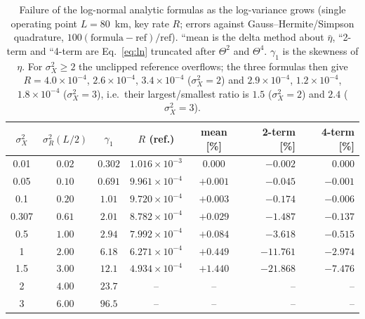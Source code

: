 \begin{table}[htbp]
\centering\small
\caption{Failure of the log-normal analytic formulas as the log-variance grows (single operating point $L=80$~km, key rate $R$; errors against Gauss--Hermite/Simpson quadrature, $100(\text{formula}-\text{ref})/\text{ref}$). ``mean is the delta method about $\bar\eta$, ``2-term and ``4-term are Eq.~\eqref{eq:ln} truncated after $\Theta^2$ and $\Theta^4$. $\gamma_1$ is the skewness of $\eta$. For $\sigma_X^2\ge2$ the unclipped reference overflows; the three formulas then give $R=4.0\times10^{-4}$, $2.6\times10^{-4}$, $3.4\times10^{-4}$ ($\sigma_X^2=2$) and $2.9\times10^{-4}$, $1.2\times10^{-4}$, $1.8\times10^{-4}$ ($\sigma_X^2=3$), i.e.\ their largest/smallest ratio is $1.5$ ($\sigma_X^2=2$) and $2.4$ ($\sigma_X^2=3$).}
\label{tab:stress}
\begin{tabular}{cccccrr}
\toprule
$\sigma_X^2$ & $\sigma_R^2(L/2)$ & $\gamma_1$ & $R$ (ref.) & mean [\%] & 2-term [\%] & 4-term [\%]\\
\midrule
0.01 & $0.02$ & $0.302$ & $1.016\times10^{-3}$ & $0.000$ & $-0.002$ & $0.000$ \\
0.05 & $0.10$ & $0.691$ & $9.961\times10^{-4}$ & $+0.001$ & $-0.045$ & $-0.001$ \\
0.1 & $0.20$ & $1.01$ & $9.720\times10^{-4}$ & $+0.003$ & $-0.174$ & $-0.006$ \\
0.307 & $0.61$ & $2.01$ & $8.782\times10^{-4}$ & $+0.029$ & $-1.487$ & $-0.137$ \\
0.5 & $1.00$ & $2.94$ & $7.992\times10^{-4}$ & $+0.084$ & $-3.618$ & $-0.515$ \\
1 & $2.00$ & $6.18$ & $6.271\times10^{-4}$ & $+0.449$ & $-11.761$ & $-2.974$ \\
1.5 & $3.00$ & $12.1$ & $4.934\times10^{-4}$ & $+1.440$ & $-21.868$ & $-7.476$ \\
2 & $4.00$ & $23.7$ & -- & -- & -- & -- \\
3 & $6.00$ & $96.5$ & -- & -- & -- & -- \\

\bottomrule
\end{tabular}
\end{table}

